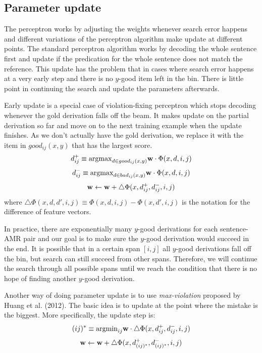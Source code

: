\subsection{Parameter update}
The perceptron works by adjusting the weights whenever search error happens and different variations of the perceptron algorithm make update
at different points. The standard perceptron algorithm works by decoding the whole sentence first and update if the predication for the whole
sentence does not match the reference. This update has the problem that in cases where search error happens at a very early step and there is
no $y$-good item left in the bin. There is little point in continuing the search and update the parameters afterwards.


Early update is a special case of violation-fixing perceptron which stops decoding whenever the gold derivation falls off the beam. It makes update on the partial derivation so far and 
move on to the next training example when the update finishes. As we don't actually have the gold derivation, we replace it with
the item in $good_{ij}(x,y)$ that has the largest score.
$$d_{ij}^{+} \equiv {\bf \argmax}_{d\in good_{ij}(x,y)} {\bf w}\cdot \Phi(x, d, i, j)$$
$$d_{ij}^{-} \equiv {\bf \argmax}_{d\in bad_{ij}(x,y)} {\bf w}\cdot \Phi(x, d, i, j)$$
$${\bf w} \leftarrow {\bf w} + \triangle \Phi(x, d_{ij}^{+}, d_{ij}^{-}, i, j)$$
where $\triangle \Phi(x, d, d', i, j) \equiv \Phi(x, d, i, j) - \Phi(x, d', i, j)$ is the notation for the difference of feature vectors.


In practice, there are exponentially many $y$-good derivations for each sentence-AMR pair and our goal is to make sure the $y$-good derivation would succeed in the end. 
It is possible that in a certain span $[i,j]$ all $y$-good derivations fall off the bin, but search can still succeed from other spans.
Therefore, we will continue the search through all possible spans until we reach the condition that there is no hope of finding another 
$y$-good derivation.


Another way of doing parameter update is to use \textit{max-violation} proposed by Huang et al. (2012). The basic idea is to update at the
point where the mistake is the biggest. More specifically, the update step is:
$$(ij)^{*} \equiv {\argmin}_{ij} {\bf w} \cdot \triangle \Phi(x, d_{ij}^{+}, d_{ij}^{-}, i, j)$$
$${\bf w} \leftarrow {\bf w} + \triangle \Phi(x, d_{(ij)^*}^{+}, d_{(ij)^*}^{-}, i, j)$$
